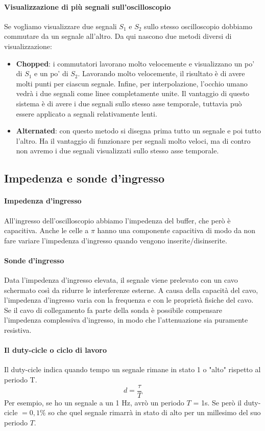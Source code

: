 \documentclass{article}
\begin{document}
	\paragraph*{Visualizzazione di più segnali sull'oscilloscopio}
	Se vogliamo visualizzare due segnali $S_1$ e $S_2$ sullo stesso oscilloscopio dobbiamo commutare da un segnale all'altro. Da qui nascono due metodi diversi di visualizzazione:
	\begin{itemize}
		\item \textbf{Chopped}: i commutatori lavorano molto velocemente e visualizzano un po' di $S_1$ e un po' di $S_2$. Lavorando molto velocemente, il risultato è di avere molti punti per ciascun segnale. Infine, per interpolazione, l'occhio umano vedrà i due segnali come linee completamente unite. Il vantaggio di questo sistema è di avere i due segnali sullo stesso asse temporale, tuttavia può essere applicato a segnali relativamente lenti.
		\item \textbf{Alternated}: con questo metodo si disegna prima tutto un segnale e poi tutto l'altro. Ha il vantaggio di funzionare per segnali molto veloci, ma di contro non avremo i due segnali visualizzati sullo stesso asse temporale.
	\end{itemize}
	\subsection*{Impedenza e sonde d'ingresso}
	\paragraph*{Impedenza d'ingresso}
	All'ingresso dell'oscilloscopio abbiamo l'impedenza del buffer, che però è capacitiva. Anche le celle a $\pi$ hanno una componente capacitiva di modo da non fare variare l'impedenza d'ingresso quando vengono inserite/disinserite.
	\paragraph*{Sonde d'ingresso}
	Data l'impedenza d'ingresso elevata, il segnale viene prelevato con un cavo schermato così da ridurre le interferenze esterne. A causa della capacità del cavo, l'impedenza d'ingresso varia con la frequenza e con le proprietà fisiche del cavo. Se il cavo di collegamento fa parte della sonda è possibile compensare l'impedenza complessiva d'ingresso, in modo che l'attenuazione sia puramente resistiva.
	\paragraph*{Il duty-cicle o ciclo di lavoro}
	Il duty-cicle indica quando tempo un segnale rimane in stato 1 o "alto" rispetto al periodo T.
	\begin{equation}
		d = \frac{\tau}{T}
	\end{equation}
	Per esempio, se ho un segnale a un 1 Hz, avrò un periodo $T$ = 1s. Se però il duty-cicle $= 0,1\% $ so che quel segnale rimarrà in stato di alto per un millesimo del suo periodo $T$.
\end{document}
